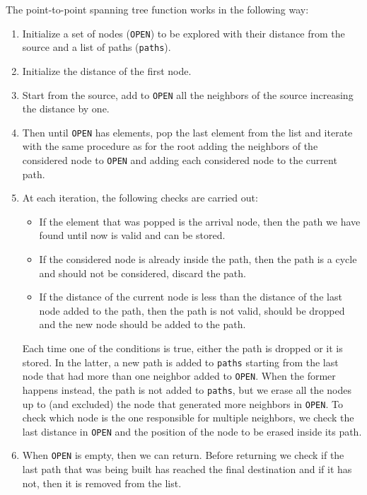 The point-to-point spanning tree function  works in the
following way:
\begin{enumerate}
  \item Initialize a set of nodes (\texttt{OPEN}) to be explored with their
    distance from the source and a list of paths (\texttt{paths}).
  \item Initialize the distance of the first node.
  \item Start from the source, add to \texttt{OPEN} all the neighbors of the 
    source increasing the distance by one. 
  \item Then until \texttt{OPEN} has elements, pop the last element from the
    list and iterate with the same procedure as for the root adding the
    neighbors of the considered node to \texttt{OPEN} and adding each
    considered node to the current path. 
  \item At each iteration, the following checks are carried out:
    \begin{itemize}
      \item If the element that was popped is the arrival node, then the path
        we have found until now is valid and can be stored.
      \item If the considered node is already inside the path, then the path is
        a cycle and should not be considered, discard the path.
      \item If the distance of the current node is less than the distance of
        the last node added to the path, then the path is not valid, should be
        dropped and the new node should be added to the path.
    \end{itemize}
    Each time one of the conditions is true, either the path is dropped or it
    is stored. In the latter, a new path is added to \texttt{paths} starting
    from the last node that had more than one neighbor added to \texttt{OPEN}.
    When the former happens instead, the path is not added to \texttt{paths},
    but we erase all the nodes up to (and excluded) the node that generated
    more neighbors in \texttt{OPEN}. To check which node is the one responsible
    for multiple neighbors, we check the last distance in \texttt{OPEN} and the
    position of the node to be erased inside its path. 
  \item When \texttt{OPEN} is empty, then we can return. Before returning we
    check if the last path that was being built has reached the final
    destination and if it has not, then it is removed from the list. 
\end{enumerate}
